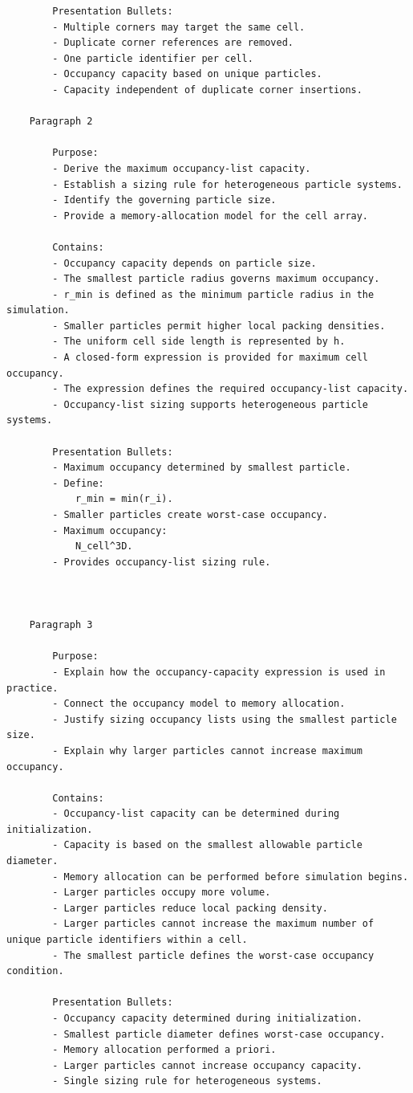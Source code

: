\begin{verbatim}
		Presentation Bullets:
		- Multiple corners may target the same cell.
		- Duplicate corner references are removed.
		- One particle identifier per cell.
		- Occupancy capacity based on unique particles.
		- Capacity independent of duplicate corner insertions.

	Paragraph 2

		Purpose:
		- Derive the maximum occupancy-list capacity.
		- Establish a sizing rule for heterogeneous particle systems.
		- Identify the governing particle size.
		- Provide a memory-allocation model for the cell array.

		Contains:
		- Occupancy capacity depends on particle size.
		- The smallest particle radius governs maximum occupancy.
		- r_min is defined as the minimum particle radius in the simulation.
		- Smaller particles permit higher local packing densities.
		- The uniform cell side length is represented by h.
		- A closed-form expression is provided for maximum cell occupancy.
		- The expression defines the required occupancy-list capacity.
		- Occupancy-list sizing supports heterogeneous particle systems.

		Presentation Bullets:
		- Maximum occupancy determined by smallest particle.
		- Define:
			r_min = min(r_i).
		- Smaller particles create worst-case occupancy.
		- Maximum occupancy:
			N_cell^3D.
		- Provides occupancy-list sizing rule.



	Paragraph 3

		Purpose:
		- Explain how the occupancy-capacity expression is used in practice.
		- Connect the occupancy model to memory allocation.
		- Justify sizing occupancy lists using the smallest particle size.
		- Explain why larger particles cannot increase maximum occupancy.

		Contains:
		- Occupancy-list capacity can be determined during initialization.
		- Capacity is based on the smallest allowable particle diameter.
		- Memory allocation can be performed before simulation begins.
		- Larger particles occupy more volume.
		- Larger particles reduce local packing density.
		- Larger particles cannot increase the maximum number of unique particle identifiers within a cell.
		- The smallest particle defines the worst-case occupancy condition.

		Presentation Bullets:
		- Occupancy capacity determined during initialization.
		- Smallest particle diameter defines worst-case occupancy.
		- Memory allocation performed a priori.
		- Larger particles cannot increase occupancy capacity.
		- Single sizing rule for heterogeneous systems.



\end{verbatim}
